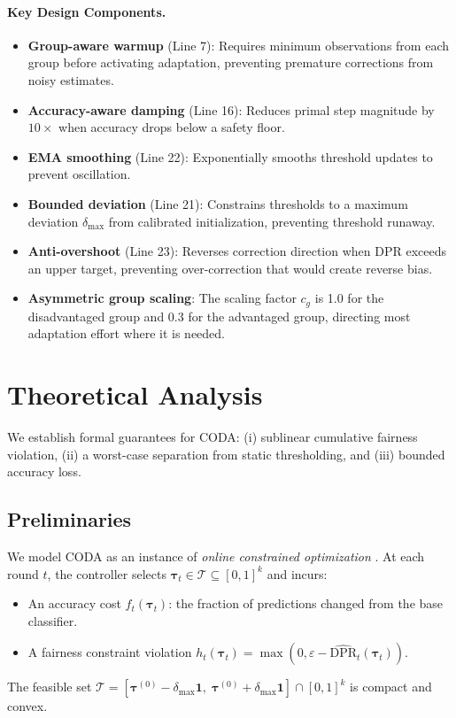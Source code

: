 \documentclass[letterpaper]{article} %
\theoremstyle{definition}
\begin{document}
\paragraph{Key Design Components.}
\begin{itemize}
    \item \textbf{Group-aware warmup} (Line 7): Requires minimum observations from each group before activating adaptation, preventing premature corrections from noisy estimates.
    \item \textbf{Accuracy-aware damping} (Line 16): Reduces primal step magnitude by $10\times$ when accuracy drops below a safety floor.
    \item \textbf{EMA smoothing} (Line 22): Exponentially smooths threshold updates to prevent oscillation.
    \item \textbf{Bounded deviation} (Line 21): Constrains thresholds to a maximum deviation $\delta_{\max}$ from calibrated initialization, preventing threshold runaway.
    \item \textbf{Anti-overshoot} (Line 23): Reverses correction direction when DPR exceeds an upper target, preventing over-correction that would create reverse bias.
    \item \textbf{Asymmetric group scaling}: The scaling factor $c_g$ is 1.0 for the disadvantaged group and 0.3 for the advantaged group, directing most adaptation effort where it is needed.
\end{itemize}

\section{Theoretical Analysis}
\label{sec:theory}

We establish formal guarantees for CODA: (i) sublinear cumulative fairness violation, (ii) a worst-case separation from static thresholding, and (iii) bounded accuracy loss.

\subsection{Preliminaries}
We model CODA as an instance of \emph{online constrained optimization} \cite{mahdavi2012trading}. At each round $t$, the controller selects $\boldsymbol{\tau}_t \in \mathcal{T} \subseteq [0,1]^k$ and incurs:
\begin{itemize}
    \item An accuracy cost $f_t(\boldsymbol{\tau}_t)$: the fraction of predictions changed from the base classifier.
    \item A fairness constraint violation $h_t(\boldsymbol{\tau}_t) = \max(0, \varepsilon - \widehat{\text{DPR}}_t(\boldsymbol{\tau}_t))$.
\end{itemize}
The feasible set $\mathcal{T} = [\boldsymbol{\tau}^{(0)} - \delta_{\max}\mathbf{1}, \; \boldsymbol{\tau}^{(0)} + \delta_{\max}\mathbf{1}] \cap [0,1]^k$ is compact and convex.
\end{document}

